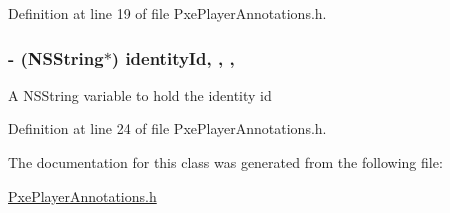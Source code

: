 Definition at line 19 of file Pxe\-Player\-Annotations.\-h.

\hypertarget{interface_pxe_player_annotations_abb8ba4dd2ddc7e5a966cc21c716e5314}{
\subsubsection[{identity\-Id}]{\setlength{\rightskip}{0pt plus 5cm}-\/ (N\-S\-String$\ast$) identity\-Id\hspace{0.3cm}{\ttfamily [read]}, {\ttfamily [write]}, {\ttfamily [nonatomic]}, {\ttfamily [strong]}}}\label{interface_pxe_player_annotations_abb8ba4dd2ddc7e5a966cc21c716e5314}
A N\-S\-String variable to hold the identity id 

Definition at line 24 of file Pxe\-Player\-Annotations.\-h.



The documentation for this class was generated from the following file\-:\begin{DoxyCompactItemize}
\item 
\hyperlink{_pxe_player_annotations_8h}{Pxe\-Player\-Annotations.\-h}\end{DoxyCompactItemize}
